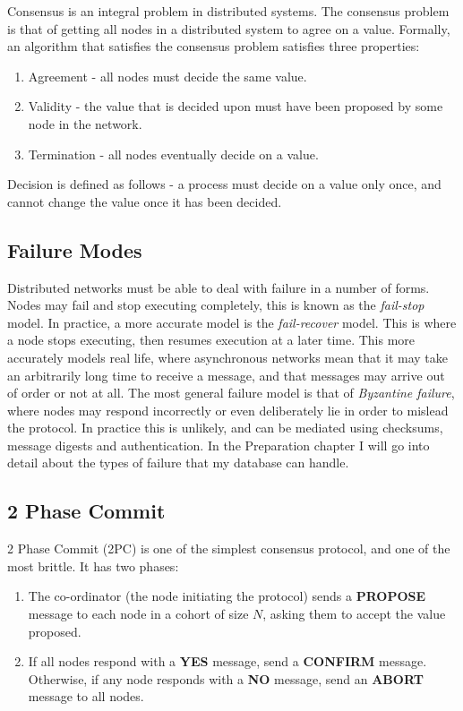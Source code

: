 \documentclass[12pt,twoside,notitlepage]{report}
\begin{document}
Consensus is an integral problem in distributed systems. The consensus problem is that of getting
all nodes in a distributed system to agree on a value. Formally, an algorithm that satisfies the
consensus problem satisfies three properties:

\begin{enumerate}
\item Agreement - all nodes must decide the same value.
\item Validity - the value that is decided upon must have been proposed by some node in the
	network.
\item Termination - all nodes eventually decide on a value.
\end{enumerate}

Decision is defined as follows - a process must decide on a value only once, and cannot change the
value once it has been decided.

\subsection*{Failure Modes}

Distributed networks must be able to deal with failure in a number of forms. Nodes may fail and
stop executing completely, this is known as the \emph{fail-stop} model. In practice, a more accurate
model is the \emph{fail-recover} model. This is where a node stops executing, then resumes execution
at a later time. This more accurately models real life, where asynchronous networks mean that it
may take an arbitrarily long time to receive a message, and that messages may arrive out of order
or not at all. The most general failure model is that of \emph{Byzantine failure}, where nodes may
respond incorrectly or even deliberately lie in order to mislead the protocol. In practice this is
unlikely, and can be mediated using checksums, message digests and authentication. In the
Preparation chapter I will go into detail about the types of failure that my database can handle.

\subsection*{2 Phase Commit}

2 Phase Commit (2PC) is one of the simplest consensus protocol, and one of the most brittle. It
has two phases:

\begin{enumerate}
\item The co-ordinator (the node initiating the protocol) sends a {\bf PROPOSE} message to each
	node in a cohort of size $N$, asking them to accept the value proposed.
\item If all nodes respond with a {\bf YES} message, send a {\bf CONFIRM} message. Otherwise, if
	any node responds with a {\bf NO} message, send an {\bf ABORT} message to all nodes.
\end{enumerate}
\end{document}
